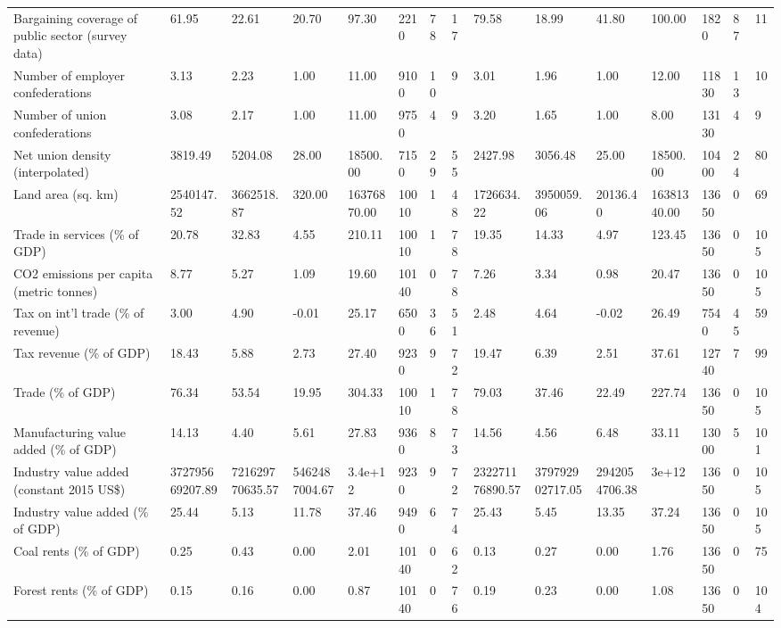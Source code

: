 \begin{longtable}{lllllllllllllll}
\addlinespace
Bargaining coverage of public sector (survey data) & 61.95 & 22.61 & 20.70 & 97.30 & 2210 & 78 & 17 & 79.58 & 18.99 & 41.80 & 100.00 & 1820 & 87 & 11\\
Number of employer confederations & 3.13 & 2.23 & 1.00 & 11.00 & 9100 & 10 & 9 & 3.01 & 1.96 & 1.00 & 12.00 & 11830 & 13 & 10\\
Number of union confederations & 3.08 & 2.17 & 1.00 & 11.00 & 9750 & 4 & 9 & 3.20 & 1.65 & 1.00 & 8.00 & 13130 & 4 & 9\\
Net union density (interpolated) & 3819.49 & 5204.08 & 28.00 & 18500.00 & 7150 & 29 & 55 & 2427.98 & 3056.48 & 25.00 & 18500.00 & 10400 & 24 & 80\\
Land area (sq. km) & 2540147.52 & 3662518.87 & 320.00 & 16376870.00 & 10010 & 1 & 48 & 1726634.22 & 3950059.06 & 20136.40 & 16381340.00 & 13650 & 0 & 69\\
\addlinespace
Trade in services (\% of GDP) & 20.78 & 32.83 & 4.55 & 210.11 & 10010 & 1 & 78 & 19.35 & 14.33 & 4.97 & 123.45 & 13650 & 0 & 105\\
CO2 emissions per capita (metric tonnes) & 8.77 & 5.27 & 1.09 & 19.60 & 10140 & 0 & 78 & 7.26 & 3.34 & 0.98 & 20.47 & 13650 & 0 & 105\\
Tax on int'l trade (\% of revenue) & 3.00 & 4.90 & -0.01 & 25.17 & 6500 & 36 & 51 & 2.48 & 4.64 & -0.02 & 26.49 & 7540 & 45 & 59\\
Tax revenue (\% of GDP) & 18.43 & 5.88 & 2.73 & 27.40 & 9230 & 9 & 72 & 19.47 & 6.39 & 2.51 & 37.61 & 12740 & 7 & 99\\
Trade (\% of GDP) & 76.34 & 53.54 & 19.95 & 304.33 & 10010 & 1 & 78 & 79.03 & 37.46 & 22.49 & 227.74 & 13650 & 0 & 105\\
\addlinespace
Manufacturing value added (\% of GDP) & 14.13 & 4.40 & 5.61 & 27.83 & 9360 & 8 & 73 & 14.56 & 4.56 & 6.48 & 33.11 & 13000 & 5 & 101\\
Industry value added (constant 2015 US\$) & 372795669207.89 & 721629770635.57 & 5462487004.67 & 3.4e+12 & 9230 & 9 & 72 & 232271176890.57 & 379792902717.05 & 2942054706.38 & 3e+12 & 13650 & 0 & 105\\
Industry value added (\% of GDP) & 25.44 & 5.13 & 11.78 & 37.46 & 9490 & 6 & 74 & 25.43 & 5.45 & 13.35 & 37.24 & 13650 & 0 & 105\\
Coal rents (\% of GDP) & 0.25 & 0.43 & 0.00 & 2.01 & 10140 & 0 & 62 & 0.13 & 0.27 & 0.00 & 1.76 & 13650 & 0 & 75\\
Forest rents (\% of GDP) & 0.15 & 0.16 & 0.00 & 0.87 & 10140 & 0 & 76 & 0.19 & 0.23 & 0.00 & 1.08 & 13650 & 0 & 104\\

\end{longtable}
